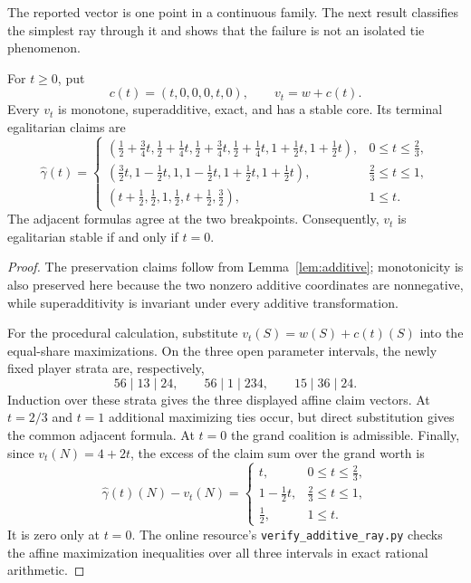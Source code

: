 The reported vector is one point in a continuous family.  The next result
classifies the simplest ray through it and shows that the failure is not an
isolated tie phenomenon.

\begin{proposition}\label{prop:additive-ray}
For $t\geq0$, put
\[
 c(t)=(t,0,0,0,t,0),\qquad v_t=w+c(t).
\]
Every $v_t$ is monotone, superadditive, exact, and has a stable core.  Its
terminal egalitarian claims are
\[
\widehat\gamma(t)=
\begin{cases}
 (\frac12+\frac34t,\frac12+\frac14t,
  \frac12+\frac34t,\frac12+\frac14t,1+\frac12t,1+\frac12t),
   &0\leq t\leq\frac23,\\[2pt]
 (\frac32t,1-\frac12t,1,1-\frac12t,
  1+\frac12t,1+\frac12t),
   &\frac23\leq t\leq1,\\[2pt]
 (t+\frac12,\frac12,1,\frac12,t+\frac12,\frac32),
   &1\leq t.
\end{cases}
\]
The adjacent formulas agree at the two breakpoints.  Consequently, $v_t$ is
egalitarian stable if and only if $t=0$.
\end{proposition}

\begin{proof}
The preservation claims follow from Lemma~\ref{lem:additive}; monotonicity is
also preserved here because the two nonzero additive coordinates are
nonnegative, while superadditivity is invariant under every additive
transformation.

For the procedural calculation, substitute $v_t(S)=w(S)+c(t)(S)$ into the
equal-share maximizations.  On the three open parameter intervals, the newly
fixed player strata are, respectively,
\[
 56\mid13\mid24,\qquad
 56\mid1\mid234,\qquad
 15\mid36\mid24.
\]
Induction over these strata gives the three displayed affine claim vectors.
At $t=2/3$ and $t=1$ additional maximizing ties occur, but direct substitution
gives the common adjacent formula.  At $t=0$ the grand coalition is admissible.
Finally, since $v_t(N)=4+2t$, the excess of the claim sum over the grand worth is
\[
 \widehat\gamma(t)(N)-v_t(N)=
 \begin{cases}
 t,&0\leq t\leq\frac23,\\
 1-\frac12t,&\frac23\leq t\leq1,\\
 \frac12,&1\leq t.
 \end{cases}
\]
It is zero only at $t=0$.  The online resource's
\texttt{verify\_additive\_ray.py} checks the affine maximization inequalities
over all three intervals in exact rational arithmetic.
\end{proof}


